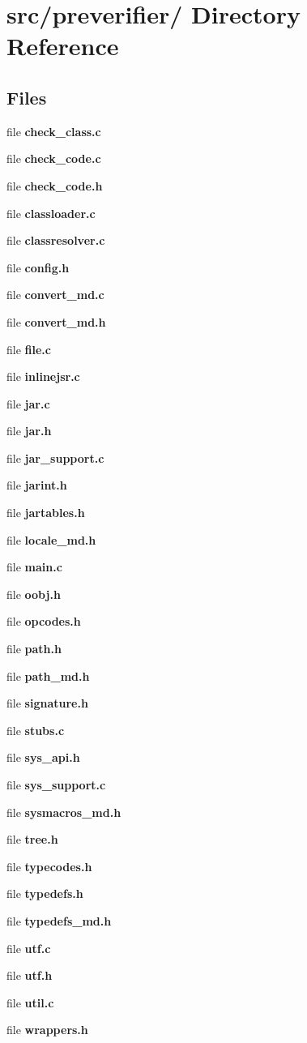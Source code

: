 \section{src/preverifier/ Directory Reference}
\label{dir_fe2b8db41ab185098f918b70d4cd2bf6}
\subsection*{Files}
\begin{DoxyCompactItemize}
\item 
file {\bfseries check\_\-class.c}
\item 
file {\bfseries check\_\-code.c}
\item 
file {\bfseries check\_\-code.h}
\item 
file {\bfseries classloader.c}
\item 
file {\bfseries classresolver.c}
\item 
file {\bfseries config.h}
\item 
file {\bfseries convert\_\-md.c}
\item 
file {\bfseries convert\_\-md.h}
\item 
file {\bfseries file.c}
\item 
file {\bfseries inlinejsr.c}
\item 
file {\bfseries jar.c}
\item 
file {\bfseries jar.h}
\item 
file {\bfseries jar\_\-support.c}
\item 
file {\bfseries jarint.h}
\item 
file {\bfseries jartables.h}
\item 
file {\bfseries locale\_\-md.h}
\item 
file {\bfseries main.c}
\item 
file {\bfseries oobj.h}
\item 
file {\bfseries opcodes.h}
\item 
file {\bfseries path.h}
\item 
file {\bfseries path\_\-md.h}
\item 
file {\bfseries signature.h}
\item 
file {\bfseries stubs.c}
\item 
file {\bfseries sys\_\-api.h}
\item 
file {\bfseries sys\_\-support.c}
\item 
file {\bfseries sysmacros\_\-md.h}
\item 
file {\bfseries tree.h}
\item 
file {\bfseries typecodes.h}
\item 
file {\bfseries typedefs.h}
\item 
file {\bfseries typedefs\_\-md.h}
\item 
file {\bfseries utf.c}
\item 
file {\bfseries utf.h}
\item 
file {\bfseries util.c}
\item 
file {\bfseries wrappers.h}
\end{DoxyCompactItemize}
